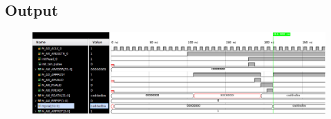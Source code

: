 \documentclass{article}
\begin{document}
\subsection{Output}
\begin{figure}[H]
    \centering
    \includegraphics[width=1\textwidth]{Resources/SingleReadBRAMoutput.png}
\end{figure}
\end{document}
